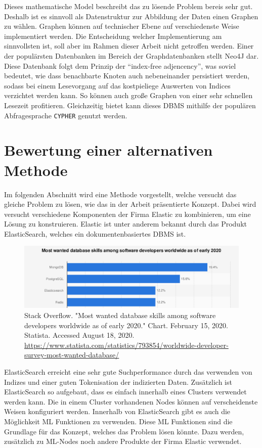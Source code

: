 \documentclass[
	12pt,
	BCOR=5mm,
	DIV=12,
	headinclude=on,
	footinclude=off,
	parskip=half,
	bibliography=totoc,
	listof=entryprefix,
	toc=listof,
	numbers=noenddot,
	plainfootsepline
]{scrreprt}
\begin{document}
Dieses mathematische Model beschreibt das zu lösende Problem bereis sehr gut. Deshalb ist es sinnvoll als Datenstruktur zur Abbildung der Daten einen Graphen zu wählen. Graphen können auf technischer Ebene auf verschiedenste Weise implementiert werden. Die Entscheidung welcher Implementierung am sinnvollsten ist, soll aber im Rahmen dieser Arbeit nicht getroffen werden. Einer der populärsten Datenbanken im Bereich der Graphdatenbanken stellt Neo4J dar. Diese Datenbank folgt dem Prinzip der \enquote{index-free adjencency}, was soviel bedeutet, wie dass benachbarte Knoten auch nebeneinander persistiert werden, sodass bei einem Lesevorgang auf das kostpieliege Auswerten von Indices verzichtet werden kann. So können auch große Graphen von einer sehr schnellen Lesezeit profitieren. Gleichzeitig bietet kann dieses \ac{DBMS} mithilfe der populären Abfragesprache \texttt{CYPHER} genutzt werden.

\section{Bewertung einer alternativen Methode}

Im folgenden Abschnitt wird eine Methode vorgestellt, welche versucht das gleiche Problem zu lösen, wie das in der Arbeit präsentierte Konzept. Dabei wird versucht verschiedene Komponenten der Firma Elastic zu kombinieren, um eine Lösung zu konstruieren. Elastic ist unter anderem bekannt durch das Produkt ElasticSearch, welches ein dokumentenbasiertes \ac{DBMS} ist.

\begin{figure}[h]
	\centering
	\includegraphics[width=1.0\linewidth]{img/statista_db.png}
	\caption{Stack Overflow. "Most wanted database skills among software developers worldwide as of early 2020." Chart. February 15, 2020. Statista. Accessed August 18, 2020. \url{https://www.statista.com/statistics/793854/worldwide-developer-survey-most-wanted-database/}}
\end{figure}

ElasticSearch erreicht eine sehr gute Suchperformance durch das verwenden von Indizes und einer guten Tokenisation der indizierten Daten. Zusätzlich ist ElasticSearch so aufgebaut, dass es einfach innerhalb eines Clusters verwendet werden kann. Die in einem Cluster vorhandenen Nodes können auf verscheidenste Weisen konfiguriert werden. Innerhalb von ElasticSearch gibt es auch die Möglichkeit \ac{ML} Funktionen zu verwenden. Diese \ac{ML} Funktionen sind die Grundlage für das Konzept, welches das Problem lösen könnte. Dazu werden, zusätzlich zu \ac{ML}-Nodes noch andere Produkte der Firma Elastic verwendet.
\end{document}
